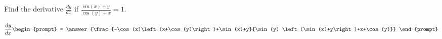 \documentclass{ximera}
\author{Gregory Hartman \and Matthew Carr}
\begin{document}
\begin{exercise}




Find the derivative $\frac{dy}{dx}$ if $\frac{sin(x)+y}{\cos(y)+x}=1$.

\[
\frac{dy}{dx}
\begin{prompt}
= \answer{\frac{-\cos (x)\left(x+\cos (y)\right)+\sin (x)+y}{\sin (y) \left(\sin (x)+y\right)+x+\cos (y)}}
\end{prompt}
\]


\end{exercise}
\end{document}
